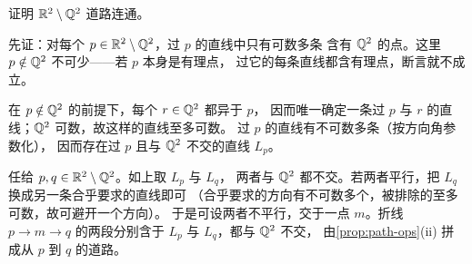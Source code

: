 \begin{exercise}[延伸]
  \label{exr:plane-minus-rationals}
  证明 \(\mathbb{R}^{2} \setminus \mathbb{Q}^{2}\) 道路连通。
  \begin{solution}
    先证：对每个 \(p \in \mathbb{R}^{2} \setminus \mathbb{Q}^{2}\)，过 \(p\) 的直线中只有可数多条
    含有 \(\mathbb{Q}^{2}\) 的点。这里 \(p \notin \mathbb{Q}^{2}\) 不可少——若 \(p\) 本身是有理点，
    过它的每条直线都含有理点，断言就不成立。

    在 \(p \notin \mathbb{Q}^{2}\) 的前提下，每个 \(r \in \mathbb{Q}^{2}\) 都异于 \(p\)，
    因而唯一确定一条过 \(p\) 与 \(r\) 的直线；\(\mathbb{Q}^{2}\) 可数，故这样的直线至多可数。
    过 \(p\) 的直线有不可数多条（按方向角参数化），
    因而存在过 \(p\) 且与 \(\mathbb{Q}^{2}\) 不交的直线 \(L_{p}\)。

    任给 \(p,q \in \mathbb{R}^{2} \setminus \mathbb{Q}^{2}\)。如上取 \(L_{p}\) 与 \(L_{q}\)，
    两者与 \(\mathbb{Q}^{2}\) 都不交。若两者平行，把 \(L_{q}\) 换成另一条合乎要求的直线即可
    （合乎要求的方向有不可数多个，被排除的至多可数，故可避开一个方向）。
    于是可设两者不平行，交于一点 \(m\)。折线 \(p \to m \to q\)
    的两段分别含于 \(L_{p}\) 与 \(L_{q}\)，都与 \(\mathbb{Q}^{2}\) 不交，
    由\cref{prop:path-ops}(ii) 拼成从 \(p\) 到 \(q\) 的道路。
  \end{solution}
\end{exercise}

